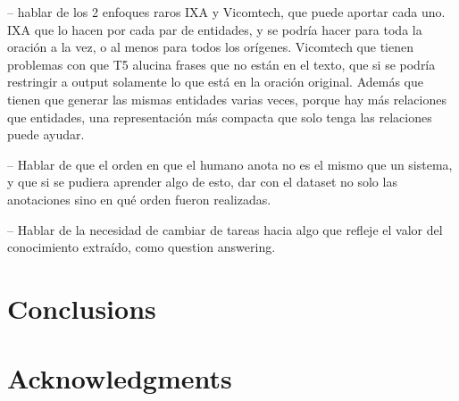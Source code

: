 \documentclass[a4paper,11pt,twocolumn,twoside]{article}
\begin{document}
-- hablar de los 2 enfoques raros IXA y Vicomtech, que puede aportar cada uno. IXA que lo hacen por cada par de entidades, y se podría hacer para toda la oración a la vez, o al menos para todos los orígenes. Vicomtech que tienen problemas con que T5 alucina frases que no están en el texto, que si se podría restringir a output solamente lo que está en la oración original. Además que tienen que generar las mismas entidades varias veces, porque hay más relaciones que entidades, una representación más compacta que solo tenga las relaciones puede ayudar.

-- Hablar de que el orden en que el humano anota no es el mismo que un sistema,
y que si se pudiera aprender algo de esto, dar con el dataset no solo las anotaciones
sino en qué orden fueron realizadas.

-- Hablar de la necesidad de cambiar de tareas hacia algo que refleje el valor
del conocimiento extraído, como question answering.

\section{Conclusions}\label{sec:conclusions}

\section*{Acknowledgments}



\end{document}
